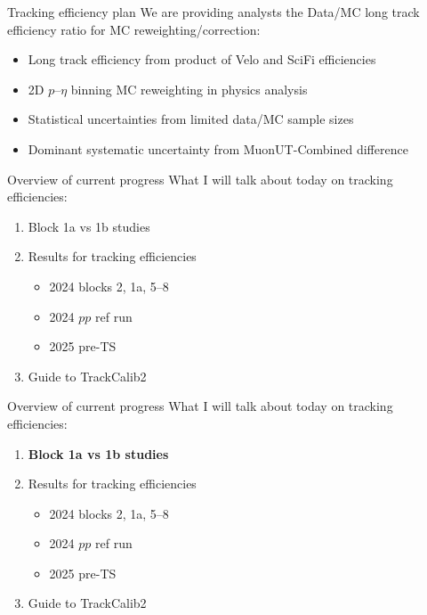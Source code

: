 \documentclass[xcolor={dvipsnames}]{beamer}
\begin{document}
\begin{frame}{Tracking efficiency plan}
  \vspace{0.0cm}
  {\Large We are providing analysts the Data/MC long track efficiency ratio for MC reweighting/correction:}
  \vspace{0.2cm}
  \begin{itemize}
    \setlength\itemsep{1.0em}
    \item{Long track efficiency from product of Velo and SciFi efficiencies}
    \item{2D $p$--$\eta$ binning MC reweighting in physics analysis}
    \item{Statistical uncertainties from limited data/MC sample sizes}
    \item{Dominant systematic uncertainty from MuonUT-Combined difference}
  \end{itemize}
\end{frame}

\begin{frame}{Overview of current progress}
  \vspace{0.0cm}
  {\large What I will talk about today on tracking efficiencies:}
  \vspace{0.2cm}
  \begin{enumerate}
    \setlength\itemsep{1.0em}
    \item{Block 1a vs 1b studies}
    \item{Results for tracking efficiencies}
    \begin{itemize}
      \item{2024 blocks 2, 1a, 5--8}
      \item{2024 $pp$ ref run}
      \item{2025 pre-TS}
    \end{itemize}
    \item{Guide to TrackCalib2}
  \end{enumerate}
\end{frame}

\begin{frame}{Overview of current progress}
  \vspace{0.0cm}
  {\large What I will talk about today on tracking efficiencies:}
  \vspace{0.2cm}
  \begin{enumerate}
    \setlength\itemsep{1.0em}
    \item{\textbf{Block 1a vs 1b studies}}
    \item{Results for tracking efficiencies}
    \begin{itemize}
      \item{2024 blocks 2, 1a, 5--8}
      \item{2024 $pp$ ref run}
      \item{2025 pre-TS}
    \end{itemize}
    \item{Guide to TrackCalib2}
  \end{enumerate}
\end{frame}
\end{document}
